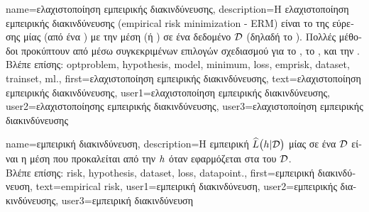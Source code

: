 {name={\foreignlanguage{greek}{ελαχιστοποίηση εμπειρικής διακινδύνευσης}}, 
	description={\foreignlanguage{greek}{Η ελαχιστοποίηση εμπειρικής διακινδύνευσης} 
		(empirical risk minimization - ERM) \foreignlanguage{greek}{είναι το}  \foreignlanguage{greek}{της  
		εύρεσης μίας}  \foreignlanguage{greek}{(από ένα} ) \foreignlanguage{greek}{με 
		την}  \foreignlanguage{greek}{μέση}  \foreignlanguage{greek}{(ή} ) 
		\foreignlanguage{greek}{σε ένα δεδομένο}  
		$\mathcal{D}$ \foreignlanguage{greek}{(δηλαδή το} ). \foreignlanguage{greek}{Πολλές μέθοδοι} 
		 \foreignlanguage{greek}{προκύπτουν από}  \foreignlanguage{greek}{μέσω 
		συγκεκριμένων επιλογών σχεδιασμού για το} , \foreignlanguage{greek}{το} , 
		\foreignlanguage{greek}{και την}  \cite[\foreignlanguage{greek}{Κεφ.} 3]{MLBasics}.\\
		\foreignlanguage{greek}{Βλέπε επίσης:} \gls{optproblem}, \gls{hypothesis}, \gls{model}, \gls{minimum}, \gls{loss}, \gls{emprisk}, \gls{dataset}, \gls{trainset}, \gls{ml}.},
	first={\foreignlanguage{greek}{ελαχιστοποίηση εμπειρικής διακινδύνευσης}},
	text={\foreignlanguage{greek}{ελαχιστοποίηση εμπειρικής διακινδύνευσης}},
	user1={\foreignlanguage{greek}{ελαχιστοποίηση εμπειρικής διακινδύνευσης}}, %
	user2={\foreignlanguage{greek}{ελαχιστοποίησης εμπειρικής διακινδύνευσης}}, %
	user3={\foreignlanguage{greek}{ελαχι\-στο\-ποί\-ηση εμπει\-ρι\-κής διακινδύνευσης}} %
}

{name={\foreignlanguage{greek}{εμπειρική διακινδύνευση}},
  description={\foreignlanguage{greek}{Η εμπειρική}  
	$\widehat{L}\big(h|\mathcal{D}\big)$ \foreignlanguage{greek}{μίας}  \foreignlanguage{greek}{σε ένα} 
	 $\mathcal{D}$ \foreignlanguage{greek}{είναι 
	η μέση}  \foreignlanguage{greek}{που προκαλείται από την 
  	$h$ όταν εφαρμόζεται στα}  \foreignlanguage{greek}{του} $\mathcal{D}$.\\
	\foreignlanguage{greek}{Βλέπε επίσης:} \gls{risk}, \gls{hypothesis}, \gls{dataset}, \gls{loss}, \gls{datapoint}.},
  first={\foreignlanguage{greek}{εμπειρική διακινδύνευση}},
  text={empirical risk},
  user1={\foreignlanguage{greek}{εμπειρική διακινδύνευση}}, %
  user2={\foreignlanguage{greek}{εμπειρικής διακινδύνευσης}}, %
  user3={\foreignlanguage{greek}{εμπειρική διακινδύνευση}} %
}

